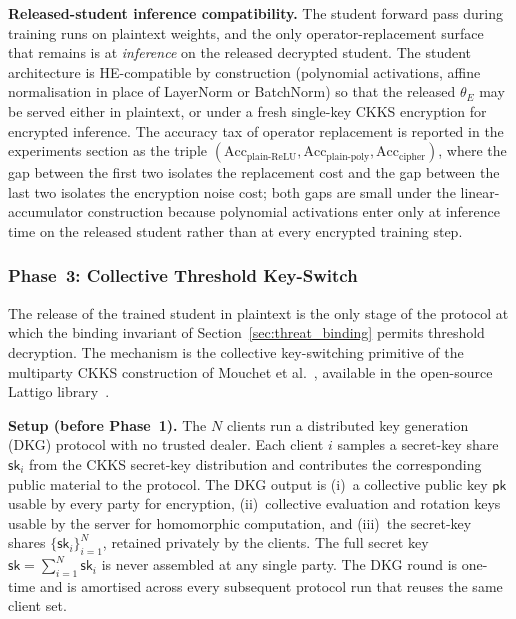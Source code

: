 \par\noindent\textbf{Released-student inference compatibility.} The student forward pass during training runs on plaintext weights, and the only operator-replacement surface that remains is at \emph{inference} on the released decrypted student. The student architecture is HE-compatible by construction (polynomial activations, affine normalisation in place of LayerNorm or BatchNorm) so that the released $\theta_E$ may be served either in plaintext, or under a fresh single-key CKKS encryption for encrypted inference. The accuracy tax of operator replacement is reported in the experiments section as the triple $(\mathrm{Acc}_{\text{plain-ReLU}}, \mathrm{Acc}_{\text{plain-poly}}, \mathrm{Acc}_{\text{cipher}})$, where the gap between the first two isolates the replacement cost and the gap between the last two isolates the encryption noise cost; both gaps are small under the linear-accumulator construction because polynomial activations enter only at inference time on the released student rather than at every encrypted training step.


\subsubsection{Phase~3: Collective Threshold Key-Switch}
\label{sec:phase3}

The release of the trained student in plaintext is the only stage of the protocol at which the binding invariant of Section~\ref{sec:threat_binding} permits threshold decryption. The mechanism is the collective key-switching primitive of the multiparty CKKS construction of Mouchet et al.~\cite{mouchet2021multiparty}, available in the open-source Lattigo library~\cite{lattigo}.

\par\noindent\textbf{Setup (before Phase~1).} The $N$ clients run a distributed key generation (DKG) protocol with no trusted dealer. Each client $i$ samples a secret-key share $\mathsf{sk}_i$ from the CKKS secret-key distribution and contributes the corresponding public material to the protocol. The DKG output is (i)~a collective public key $\mathsf{pk}$ usable by every party for encryption, (ii)~collective evaluation and rotation keys usable by the server for homomorphic computation, and (iii)~the secret-key shares $\{\mathsf{sk}_i\}_{i=1}^{N}$, retained privately by the clients. The full secret key $\mathsf{sk} = \sum_{i=1}^{N} \mathsf{sk}_i$ is never assembled at any single party. The DKG round is one-time and is amortised across every subsequent protocol run that reuses the same client set.

